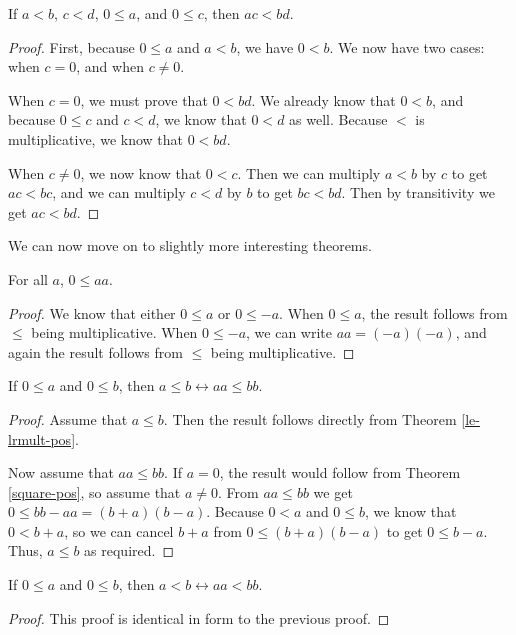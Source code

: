 \documentclass[../math.tex]{subfiles}
\begin{document}
\begin{theorem}
    If $a < b$, $c < d$, $0 \leq a$, and $0 \leq c$, then $ac < bd$.
\end{theorem}
\begin{proof}
    First, because $0 \leq a$ and $a < b$, we have $0 < b$.  We now have two
    cases: when $c = 0$, and when $c \neq 0$.

    When $c = 0$, we must prove that $0 < bd$.  We already know that $0 < b$,
    and because $0 \leq c$ and $c < d$, we know that $0 < d$ as well.  Because
    $<$ is multiplicative, we know that $0 < bd$.

    When $c \neq 0$, we now know that $0 < c$.  Then we can multiply $a < b$ by
    $c$ to get $ac < bc$, and we can multiply $c < d$ by $b$ to get $bc < bd$.
    Then by transitivity we get $ac < bd$.
\end{proof}

We can now move on to slightly more interesting theorems.

\begin{theorem} \label{square-pos}
    For all $a$, $0 \leq aa$.
\end{theorem}
\begin{proof}
    We know that either $0 \leq a$ or $0 \leq -a$.  When $0 \leq a$, the result
    follows from $\leq$ being multiplicative.  When $0 \leq -a$, we can write
    $aa = (-a)(-a)$, and again the result follows from $\leq$ being
    multiplicative.
\end{proof}

\begin{theorem}
    If $0 \leq a$ and $0 \leq b$, then $a \leq b \leftrightarrow aa \leq bb$.
\end{theorem}
\begin{proof}
    Assume that $a \leq b$.  Then the result follows directly from Theorem
    \ref{le-lrmult-pos}.

    Now assume that $aa \leq bb$.  If $a = 0$, the result would follow from
    Theorem \ref{square-pos}, so assume that $a \neq 0$.  From $aa \leq bb$ we
    get $0 \leq bb - aa = (b + a)(b - a)$.  Because $0 < a$ and $0 \leq b$, we
    know that $0 < b + a$, so we can cancel $b + a$ from $0 \leq (b + a)(b - a)$
    to get $0 \leq b - a$.  Thus, $a \leq b$ as required.
\end{proof}

\begin{theorem}
    If $0 \leq a$ and $0 \leq b$, then $a < b \leftrightarrow aa < bb$.
\end{theorem}
\begin{proof}
    This proof is identical in form to the previous proof.
\end{proof}
\end{document}
